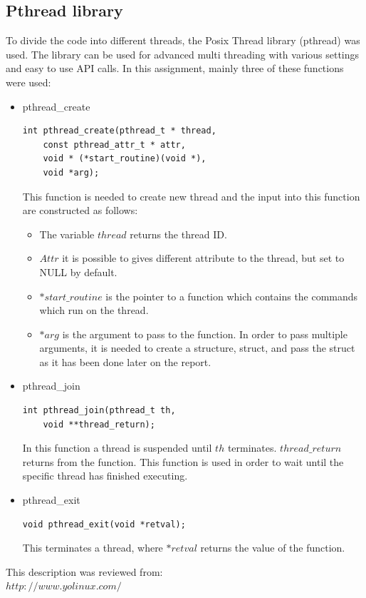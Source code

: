 \documentclass[journal]{IEEEtran}
\begin{document}
\subsection{Pthread library}
To divide the code into different threads, the Posix Thread library (pthread) was used.
The library can be used for advanced multi threading with various settings and easy to use API calls. In this assignment, mainly three of these functions were used:

\begin{itemize}
	\item pthread\_create	
\begin{lstlisting}
int pthread_create(pthread_t * thread,
	const pthread_attr_t * attr,
	void * (*start_routine)(void *), 
	void *arg);
\end{lstlisting}
This function is needed to create new thread and the input into this function are constructed as follows:
\begin{itemize}
	\item The variable \(thread\) returns the thread ID. 
	\item \(Attr\) it is possible to gives different attribute to the thread, but set to NULL by default.
	\item \(*start\_routine\) is the pointer to a function which contains the commands which run on the thread. 
	\item \(*arg\) is the argument to pass to the function. In order to pass multiple arguments, it is needed to create a structure, struct, and pass the struct as it has been done later on the report.\\
\end{itemize}

	\item pthread\_join
\begin{lstlisting}
int pthread_join(pthread_t th, 
	void **thread_return);
\end{lstlisting}
In this function a thread is suspended until \(th\) terminates. \(thread\_return\) returns from the function.
This function is used in order to wait until the specific thread has finished executing.
	\item pthread\_exit
\begin{lstlisting}
void pthread_exit(void *retval);
\end{lstlisting}
This terminates a thread, where \(*retval\) returns the value of the function.
\end{itemize}
This description was reviewed from:\\
 \(http://www.yolinux.com/\)
\end{document}
